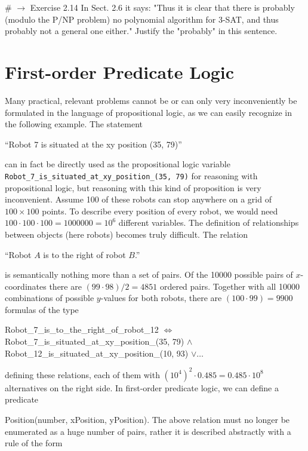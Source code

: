 \documentclass[10pt]{book}
\begin{document}
\# $\rightarrow$ Exercise 2.14 In Sect. 2.6 it says: "Thus it is clear that there is probably (modulo the P/NP problem) no polynomial algorithm for 3-SAT, and thus probably not a general one either." Justify the "probably" in this sentence.

\chapter{First-order Predicate Logic}
Many practical, relevant problems cannot be or can only very inconveniently be formulated in the language of propositional logic, as we can easily recognize in the following example. The statement
\begin{displayquote}
``Robot 7 is situated at the xy position (35, 79)''
\end{displayquote}

can in fact be directly used as the propositional logic variable \verb|Robot_7_is_situated_at_xy_position_(35, 79)| for reasoning with propositional logic, but reasoning with this kind of proposition is very inconvenient. Assume 100 of these robots can stop anywhere on a grid of $100 \times 100$ points. To describe every position of every robot, we would need $100 \cdot 100 \cdot 100=1000000=10^{6}$ different variables. The definition of relationships between objects (here robots) becomes truly difficult. The relation

\begin{displayquote}
``Robot $A$ is to the right of robot $B$.''
\end{displayquote}

is semantically nothing more than a set of pairs. Of the 10000 possible pairs of $x$-coordinates there are $(99 \cdot 98) / 2=4851$ ordered pairs. Together with all 10000 combinations of possible $y$-values for both robots, there are $(100 \cdot 99)=9900$ formulas of the type

Robot\_7\_is\_to\_the\_right\_of\_robot\_12 $\Leftrightarrow$ Robot\_7\_is\_situated\_at\_xy\_position\_(35, 79) $\wedge$ Robot\_12\_is\_situated\_at\_xy\_position\_(10, 93) $\vee \ldots$

defining these relations, each of them with $\left(10^{4}\right)^{2} \cdot 0.485=0.485 \cdot 10^{8}$ alternatives on the right side. In first-order predicate logic, we can define a predicate

Position(number, xPosition, yPosition). The above relation must no longer be enumerated as a huge number of pairs, rather it is described abstractly with a rule of the form
\end{document}
